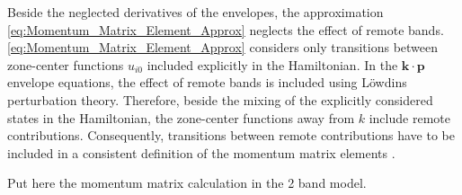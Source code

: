 Beside the neglected derivatives of the envelopes, the approximation
\ref{eq:Momentum_Matrix_Element_Approx} neglects the effect of remote
bands. \ref{eq:Momentum_Matrix_Element_Approx} considers only transitions
between zone-center functions $u_{i0}$ included explicitly in the
Hamiltonian. In the $\mathbf{k}\cdot\mathbf{p}$ envelope equations,
the effect of remote bands is included using L\"{o}wdins perturbation
theory. Therefore, beside the mixing of the explicitly considered
states in the Hamiltonian, the zone-center functions away from $k$
include remote contributions. Consequently, transitions between remote
contributions have to be included in a consistent definition of the
momentum matrix elements \citealp{Enders1995a}.

%
\begin{lyxgreyedout}
Put here the momentum matrix calculation in the 2 band model.
\end{lyxgreyedout}

